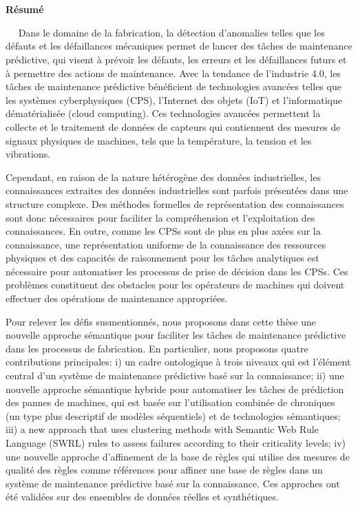 \chapter*{}
\normalsize
\vspace{-6cm}
\begin{center}
\large \textbf{Résumé}
\end{center}
\small

$\quad  \!\!\!\!\!\!\!\!\!\!\!$ Dans le domaine de la fabrication, la détection d'anomalies telles que les défauts et les défaillances mécaniques permet de lancer des tâches de maintenance prédictive, qui visent à prévoir les défauts, les erreurs et les défaillances futurs et à permettre des actions de maintenance. Avec la tendance de l'industrie 4.0, les tâches de maintenance prédictive bénéficient de technologies avancées telles que les systèmes cyberphysiques (CPS), l'Internet des objets (IoT) et l'informatique dématérialisée (cloud computing). Ces technologies avancées permettent la collecte et le traitement de données de capteurs qui contiennent des mesures de signaux physiques de machines, tels que la température, la tension et les vibrations.

Cependant, en raison de la nature hétérogène des données industrielles, les connaissances extraites des données industrielles sont parfois présentées dans une structure complexe. Des méthodes formelles de représentation des connaissances sont donc nécessaires pour faciliter la compréhension et l'exploitation des connaissances. En outre, comme les CPSs sont de plus en plus axées sur la connaissance, une représentation uniforme de la connaissance des ressources physiques et des capacités de raisonnement pour les tâches analytiques est nécessaire pour automatiser les processus de prise de décision dans les CPSs. Ces problèmes constituent des obstacles pour les opérateurs de machines qui doivent effectuer des opérations de maintenance appropriées.

Pour relever les défis susmentionnés, nous proposons dans cette thèse une nouvelle approche sémantique pour faciliter les tâches de maintenance prédictive dans les processus de fabrication. En particulier, nous proposons quatre contributions principales: i) un cadre ontologique à trois niveaux qui est l'élément central d'un système de maintenance prédictive basé sur la connaissance; ii) une nouvelle approche sémantique hybride pour automatiser les tâches de prédiction des pannes de machines, qui est basée sur l'utilisation combinée de chroniques (un type plus descriptif de modèles séquentiels) et de technologies sémantiques; iii) a new approach that uses clustering methods with Semantic Web Rule Language (SWRL) rules to assess failures according to their criticality levels; iv) une nouvelle approche d'affinement de la base de règles qui utilise des mesures de qualité des règles comme références pour affiner une base de règles dans un système de maintenance prédictive basé sur la connaissance. Ces approches ont été validées sur des ensembles de données réelles et synthétiques.

